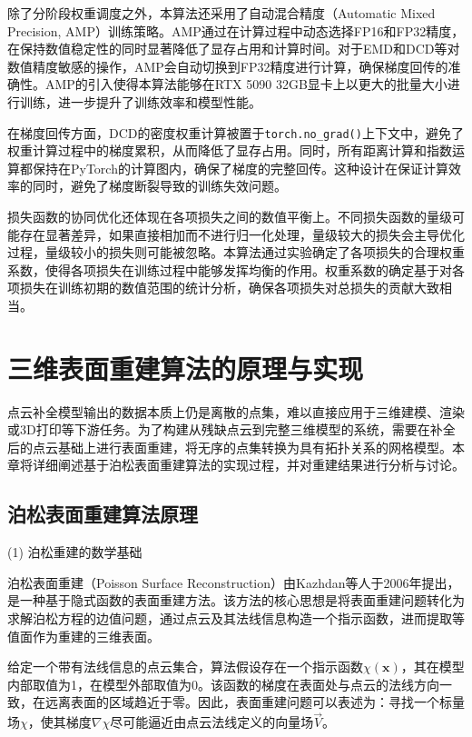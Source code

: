 除了分阶段权重调度之外，本算法还采用了自动混合精度（Automatic Mixed Precision, AMP）训练策略。AMP通过在计算过程中动态选择FP16和FP32精度，在保持数值稳定性的同时显著降低了显存占用和计算时间。对于EMD和DCD等对数值精度敏感的操作，AMP会自动切换到FP32精度进行计算，确保梯度回传的准确性。AMP的引入使得本算法能够在RTX 5090 32GB显卡上以更大的批量大小进行训练，进一步提升了训练效率和模型性能。

在梯度回传方面，DCD的密度权重计算被置于\texttt{torch.no\_grad()}上下文中，避免了权重计算过程中的梯度累积，从而降低了显存占用。同时，所有距离计算和指数运算都保持在PyTorch的计算图内，确保了梯度的完整回传。这种设计在保证计算效率的同时，避免了梯度断裂导致的训练失效问题。

损失函数的协同优化还体现在各项损失之间的数值平衡上。不同损失函数的量级可能存在显著差异，如果直接相加而不进行归一化处理，量级较大的损失会主导优化过程，量级较小的损失则可能被忽略。本算法通过实验确定了各项损失的合理权重系数，使得各项损失在训练过程中能够发挥均衡的作用。权重系数的确定基于对各项损失在训练初期的数值范围的统计分析，确保各项损失对总损失的贡献大致相当。

\section{三维表面重建算法的原理与实现}

点云补全模型输出的数据本质上仍是离散的点集，难以直接应用于三维建模、渲染或3D打印等下游任务。为了构建从残缺点云到完整三维模型的系统，需要在补全后的点云基础上进行表面重建，将无序的点集转换为具有拓扑关系的网格模型。本章将详细阐述基于泊松表面重建算法的实现过程，并对重建结果进行分析与讨论。

\subsection{泊松表面重建算法原理}

(1) 泊松重建的数学基础

泊松表面重建（Poisson Surface Reconstruction）由Kazhdan等人于2006年提出，是一种基于隐式函数的表面重建方法\cite{kazhdan2006poisson}。该方法的核心思想是将表面重建问题转化为求解泊松方程的边值问题，通过点云及其法线信息构造一个指示函数，进而提取等值面作为重建的三维表面。

给定一个带有法线信息的点云集合，算法假设存在一个指示函数$\chi(\mathbf{x})$，其在模型内部取值为1，在模型外部取值为0。该函数的梯度在表面处与点云的法线方向一致，在远离表面的区域趋近于零。因此，表面重建问题可以表述为：寻找一个标量场$\chi$，使其梯度$\nabla\chi$尽可能逼近由点云法线定义的向量场$\vec{V}$。

